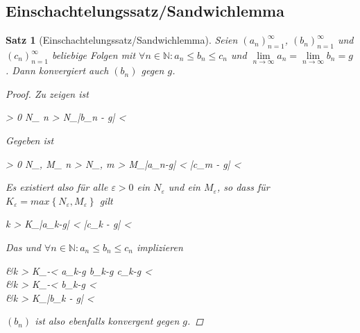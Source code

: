 \documentclass{article}
\newtheorem{thm}{Satz}[section]
\newenvironment{aleq*}{\begin{equation*}\begin{aligned}}{\end{aligned}\end{equation*}}
\begin{document}
	\subsection{Einschachtelungssatz/Sandwichlemma}
	\begin{thm}[Einschachtelungssatz/Sandwichlemma]
		Seien \((a_n)_{n=1}^\infty\), \((b_n)_{n=1}^\infty\) und \((c_n)_{n=1}^\infty\) beliebige Folgen mit \(\forall n \in \mathbb{N} \colon a_n \leq b_n \leq c_n\) und \(\lim\limits_{n \to \infty} a_n = \lim\limits_{n \to \infty} b_n = g\). Dann konvergiert auch \((b_n)\) gegen \(g\).
		
		\begin{proof}
			Zu zeigen ist
			\begin{aleq*}
				\forall \varepsilon > 0 \colon \exists N_\varepsilon \in {} \colon \forall n > N_\varepsilon \colon |b_n - g| < \varepsilon {}
			\end{aleq*}
			\par
			Gegeben ist
			\begin{aleq*}
				\label{gegebenSandwich}
				\forall \varepsilon > 0 \colon \exists N_\varepsilon, M_\varepsilon \in {} \colon \forall n > N_\varepsilon, m > M_\varepsilon \colon |a_n-g| < \varepsilon \land |c_m - g| < \varepsilon \text{.}
			\end{aleq*}
			\par
			Es existiert also für alle \(\varepsilon > 0\) ein \(N_\varepsilon\) und ein \(M_\varepsilon\), so dass für \(K_\varepsilon = max \left\lbrace N_\varepsilon, M_\varepsilon \right\rbrace\) gilt
			\begin{aleq*}
				\forall k > K_\varepsilon \colon |a_k-g| < \varepsilon \land |c_k - g| < \varepsilon {}
			\end{aleq*}
			\par
			Das und \(\forall n \in \mathbb{N} \colon a_n \leq b_n \leq c_n\) implizieren
			\begin{aleq*}
				&\forall k > K_\varepsilon \colon -\varepsilon < a_k-g \leq b_k-g \leq c_k-g < \varepsilon \\
				\implies &\forall k > K_\varepsilon \colon -\varepsilon < b_k-g < \varepsilon \\
				\iff &\forall k > K_\varepsilon \colon |b_k - g| < \varepsilon
			\end{aleq*}
			\par
			\((b_n)\) ist also ebenfalls konvergent gegen \(g\).
		\end{proof}
	\end{thm}
	
\end{document}
